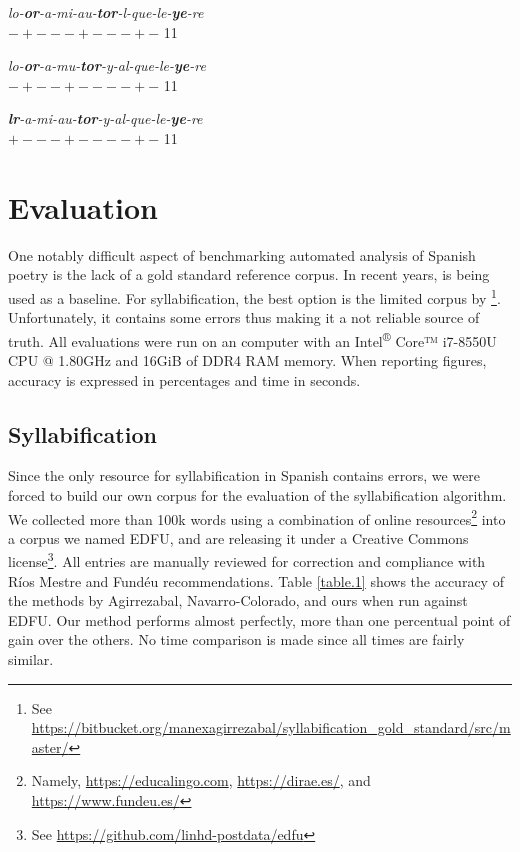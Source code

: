 \documentclass[a4paper,11pt,twocolumn,twoside]{article}
\begin{document}
\begin{subexamples}[preamble={\textit{loor a mi autor, y al que leyere}}]\label{example.4}
\item\label{example.4a}
\textit{lo-\textbf{or}-a-mi-au-\textbf{tor}-l-que-le-\textbf{ye}-re} \\
$-+---+---+-$ 11 \\
\item\label{example.4b}
\textit{lo-\textbf{or}-a-mu-\textbf{tor}-y-al-que-le-\textbf{ye}-re} \\
$-+--+----+-$ 11 \\
\item\label{example.4c}
\textit{\textbf{lr}-a-mi-au-\textbf{tor}-y-al-que-le-\textbf{ye}-re} \\
$+---+----+-$ 11 \\
\end{subexamples}

\section{Evaluation}
One notably difficult aspect of benchmarking automated analysis of Spanish poetry is the lack of a gold standard reference corpus. In recent years, \cite{navarro2016metrical} is being used as a baseline. For syllabification, the best option is the limited corpus by \cite{agirrezabal2014assigning}\footnote{See \url{https://bitbucket.org/manexagirrezabal/syllabification_gold_standard/src/master/}}. Unfortunately, it contains some errors thus making it a not reliable source of truth. All evaluations were run on an computer with an Intel\textsuperscript{®} Core™ i7-8550U CPU @ 1.80GHz and 16GiB of DDR4 RAM memory. When reporting figures, accuracy is expressed in percentages and time in seconds.

\subsection{Syllabification}
Since the only resource for syllabification in Spanish contains errors, we were forced to build our own corpus for the evaluation of the syllabification algorithm. We collected more than 100k words using a combination of online resources\footnote{Namely, \url{https://educalingo.com}, \url{https://dirae.es/}, and \url{https://www.fundeu.es/}} into a corpus we named EDFU, and are releasing it under a Creative Commons license\footnote{See \url{https://github.com/linhd-postdata/edfu}}. All entries are manually reviewed for correction and compliance with Ríos Mestre and Fundéu recommendations.
Table \ref{table.1} shows the accuracy of the methods by Agirrezabal, Navarro-Colorado, and ours when run against EDFU. Our method performs almost perfectly, more than one percentual point of gain over the others. No time comparison is made since all times are fairly similar.
\end{document}
